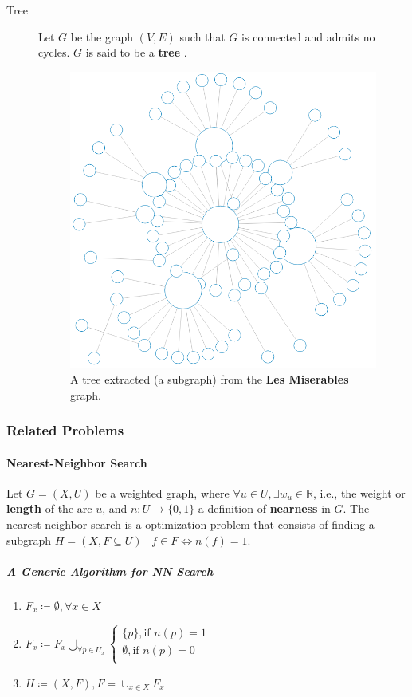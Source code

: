 \documentclass[12pt]{article}
\begin{document}
\begin{description}
	\item[Tree] Let $G$ be the graph $(V, E)$ such that $G$ is connected and admits no cycles. $G$ is  said to be a \textbf{tree} \cite{berge1973}.

	\begin{figure}[H]
		\centering
		\includegraphics[width=.4\linewidth]{graphs/tree}
		\captionsetup{justification=centering}
		\caption{A tree extracted (a subgraph) from the \textbf{Les Miserables} graph.}
		\label{tree}
	\end{figure}
\end{description}

\subsubsection{Related Problems}

\paragraph{Nearest-Neighbor Search}

Let $G = (X, U)$ be a weighted graph, where $ \forall u \in U, \exists w_u \in \mathbb{R}$, i.e., the weight or \textbf{length} of the arc $u$, and $n\colon U \to \{0, 1\}$ a definition of \textbf{nearness} in $G$. The nearest-neighbor search is a optimization problem that consists of finding a subgraph $H = (X, F \subseteq U) \mid f \in F \iff n(f) = 1$.

\subparagraph{A Generic Algorithm for NN Search}
\begin{enumerate}
	\item $F_x \coloneqq \emptyset, \forall x \in X$
	\item $F_x \coloneqq F_x \bigcup_{\forall p \in U_x} \begin{cases}
	\{p\}, \text{if } n(p) = 1 \\
	\emptyset, \text{if } n(p) = 0 \\
	\end{cases}$
	\item $H \coloneqq (X, F), F = \cup_{x\in X} F_x$
\end{enumerate}
\end{document}
